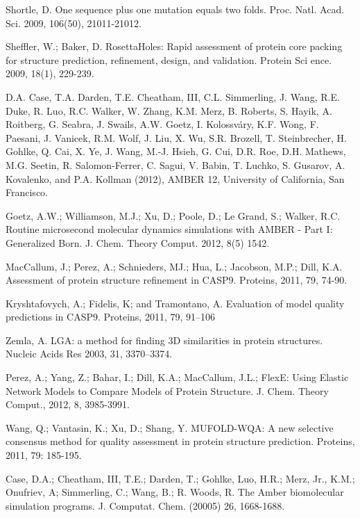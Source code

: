 \documentclass[12pt]{article}
\begin{document}
\begin{thebibliography}{99}
Shortle, D. One sequence plus one mutation equals two folds. Proc. Natl. Acad. Sci. 2009, 106(50), 21011-21012.

Sheffler, W.; Baker, D. RosettaHoles: Rapid assessment of protein core packing for structure prediction, refinement, design, and validation. Protein Sci
ence. 2009, 18(1), 229-239.

D.A. Case, T.A. Darden, T.E. Cheatham, III, C.L. Simmerling, J. Wang, R.E. Duke, R. Luo, R.C. Walker, W. Zhang, K.M. Merz, B. Roberts, S. Hayik, A. Roitberg, G. Seabra, J. Swails, A.W. Goetz, I. Kolossváry, K.F. Wong, F. Paesani, J. Vanicek, R.M. Wolf, J. Liu, X. Wu, S.R. Brozell, T. Steinbrecher, H. Gohlke, Q. Cai, X. Ye, J. Wang, M.-J. Hsieh, G. Cui, D.R. Roe, D.H. Mathews, M.G. Seetin, R. Salomon-Ferrer, C. Sagui, V. Babin, T. Luchko, S. Gusarov, A. Kovalenko, and P.A. Kollman (2012), AMBER 12, University of California, San Francisco.

Goetz, A.W.; Williamson, M.J.; Xu, D.; Poole, D.; Le Grand, S.; Walker, R.C. Routine microsecond molecular dynamics simulations with AMBER - Part I: Generalized
Born. J. Chem. Theory Comput. 2012, 8(5) 1542.

MacCallum, J.; Perez, A.; Schnieders, MJ.; Hua, L.; Jacobson, M.P.; Dill, K.A. Assessment of protein structure refinement
in CASP9. Proteins, 2011, 79, 74-90.

Kryshtafovych, A.; Fidelis, K; and Tramontano, A. Evaluation of model quality predictions in CASP9. Proteins, 2011, 79, 91–106

Zemla, A. LGA: a method for finding 3D similarities in protein structures. Nucleic Acids Res 2003, 31, 3370–3374.

Perez, A.; Yang, Z.; Bahar, I.; Dill, K.A.; MacCallum, J.L.; FlexE: Using Elastic Network Models to Compare Models of Protein Structure. J. Chem. Theory Comput., 2012, 8, 3985-3991.

Wang, Q.; Vantasin, K.; Xu, D.; Shang, Y. MUFOLD-WQA: A new selective consensus method for quality assessment in protein structure prediction.
Proteins, 2011, 79: 185-195.

Case, D.A.; Cheatham, III, T.E.; Darden, T.; Gohlke, Luo, H.R.; Merz, Jr., K.M.;  Onufriev, A; Simmerling, C.;
Wang, B.; R. Woods, R. The Amber biomolecular simulation programs. J. Computat. Chem. (20005) 26, 1668-1688.

\end{thebibliography}
\end{document}
